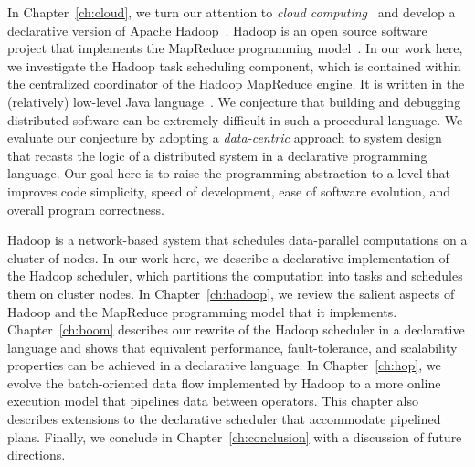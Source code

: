 In Chapter~\ref{ch:cloud}, we turn our attention to {\em cloud
computing}~\cite{abovetheclouds} and develop a declarative version of Apache
Hadoop~\cite{hadoop}.  Hadoop is an open source software project that
implements the MapReduce programming model~\cite{mapreduce-osdi}.  In our work
here, we investigate the Hadoop task scheduling component, which is contained
within the centralized coordinator of the Hadoop MapReduce engine.  It is
written in the (relatively) low-level Java language~\cite{java}.  We conjecture
that building and debugging distributed software can be extremely difficult in
such a procedural language.  We evaluate our conjecture by adopting a {\em
data-centric} approach to system design that recasts the logic of a distributed
system in a declarative programming language.  Our goal here is to raise the
programming abstraction to a level that improves code simplicity, speed of
development, ease of software evolution, and overall program correctness.

Hadoop is a network-based system that schedules data-parallel computations on a
cluster of nodes.  In our work here, we describe a declarative implementation
of the Hadoop scheduler, which partitions the computation into tasks and
schedules them on cluster nodes.  In Chapter~\ref{ch:hadoop}, we review the
salient aspects of Hadoop and the MapReduce programming model that it
implements.  Chapter~\ref{ch:boom} describes our rewrite of the Hadoop
scheduler in a declarative language and shows that equivalent performance,
fault-tolerance, and scalability properties can be achieved in a declarative
language.  In Chapter~\ref{ch:hop}, we evolve the batch-oriented data flow
implemented by Hadoop to a more online execution model that pipelines data
between operators.  This chapter also describes extensions to the declarative
scheduler that accommodate pipelined plans.  Finally, we conclude in
Chapter~\ref{ch:conclusion} with a discussion of future directions.




